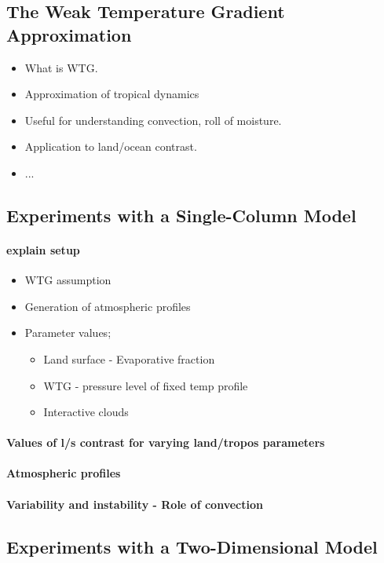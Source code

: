 \subsection{The Weak Temperature Gradient Approximation}
\begin{itemize}
	\item What is WTG.
	\item Approximation of tropical dynamics
	\item Useful for understanding convection, roll of moisture.
	\item Application to land/ocean contrast.
	\item ...
\end{itemize}

\subsection{Experiments with a Single-Column Model}
\paragraph{explain setup}
\begin{itemize}
	\item WTG assumption
	\item Generation of atmospheric profiles
	\item Parameter values;
		\begin{itemize}
			\item Land surface - Evaporative fraction
			\item WTG - pressure level of fixed temp profile
			\item Interactive clouds
		\end{itemize}
\end{itemize}
\paragraph{Values of l/s contrast for varying land/tropos parameters}
\paragraph{Atmospheric profiles}
\paragraph{Variability and instability - Role of convection}


\subsection{Experiments with a Two-Dimensional Model}

